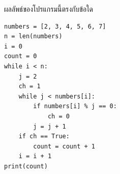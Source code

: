 \question ผลลัพธ์ของโปรแกรมนี้ตรงกับข้อใด
\begin{verbatim}
numbers = [2, 3, 4, 5, 6, 7]
n = len(numbers)
i = 0
count = 0
while i < n:
    j = 2
    ch = 1
    while j < numbers[i]:
        if numbers[i] % j == 0:
            ch = 0
        j = j + 1
    if ch == True:
        count = count + 1
    i = i + 1
print(count)
\end{verbatim}
